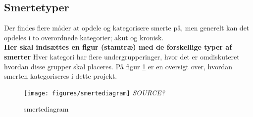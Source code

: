 \subsection{Smertetyper}


Der findes flere måder at opdele og kategorisere smerte på, men generelt kan det opdeles i to overordnede kategorier; akut og kronisk. \\
\textbf{Her skal indsættes en figur (stamtræ) med de forskellige typer af smerter} 
Hver kategori har flere undergrupperinger, hvor det er omdiskuteret hvordan disse grupper skal placeres. \citep{Giangragorio1997} På figur \ref{smertediagram} er en oversigt over, hvordan smerten kategoriseres i dette projekt.

\begin{figure}[H]
	\caption{smertediagram}
	\label{smertediagram}
	\centering
	\texttt{[image: figures/smertediagram]}
	\flushleft
	\textit{SOURCE?}
\end{figure}

